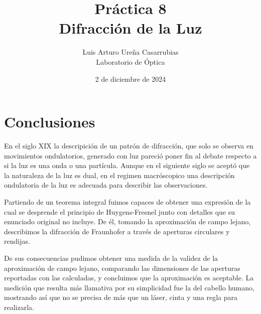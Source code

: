 \documentclass[11pt, spanish]{article}
\title{
	\textbf{Práctica 8\\
	Difracción de la Luz}
}
\author{Luis Arturo Ureña Casarrubias\\
Laboratorio de Óptica}
\date{2 de diciembre de 2024}
\numberwithin{equation}{section}
\begin{document}
\maketitle


\begin{multicols}{2}


\end{multicols}


\begin{multicols}{2}



\end{multicols}
\section{Conclusiones}
En el siglo XIX la descripición de un patrón de difracción, que solo se observa en movimientos ondulatorios, generado con luz pareció poner fin al debate respecto a si la luz es una onda o una partícula. Aunque en el siguiente siglo se aceptó que la naturaleza de la luz es dual, en el regimen macróscopico una descripción ondulatoria de la luz es adecuada para describir las observaciones.

Partiendo de un teorema integral fuimos capaces de obtener una expresión de la cual se desprende el principio de Huygens-Fresnel junto con detalles que su enunciado original no incluye. De él, tomando la aproximación de campo lejano, describimos la difracción de Fraunhofer a través de aperturas circulares y rendijas.

De sus consecuencias pudimos obtener una medida de la validez de la aproximación de campo lejano, comparando las dimensiones de las aperturas reportadas con las calculadas, y concluimos que la aproximación es aceptable. La medición que resulta más llamativa por su simplicidad fue la del cabello humano, mostrando así que no se precisa de más que un láser, cinta y una regla para realizarla.

\printbibliography
\end{document}
